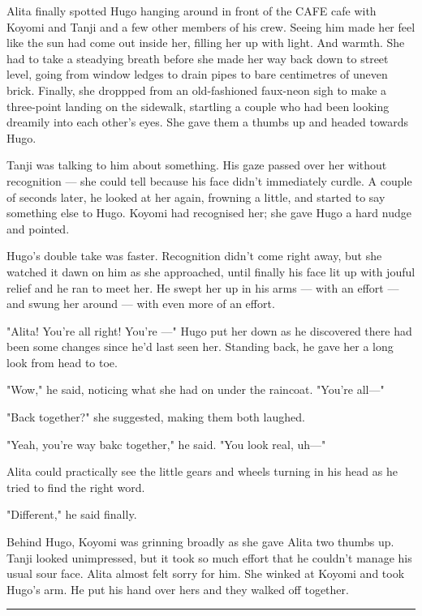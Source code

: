 \documentclass[11pt]{article}
\begin{document}
Alita finally spotted Hugo hanging around in front of the CAFE cafe with Koyomi and Tanji and a few other members of his crew. Seeing him made her feel like the sun had come out inside her, filling her up with light. And warmth. She had to take a steadying breath before she made her way back down to street level, going from window ledges to drain pipes to bare centimetres of uneven brick. Finally, she droppped from an old-fashioned faux-neon sigh to make a three-point landing on the sidewalk, startling a couple who had been looking dreamily into each other's eyes. She gave them a thumbs up and headed towards Hugo.

Tanji was talking to him about something. His gaze passed over her without recognition --- she could tell because his face didn't immediately curdle. A couple of seconds later, he looked at her again, frowning a little, and started to say something else to Hugo. Koyomi had recognised her; she gave Hugo a hard nudge and pointed.

Hugo's double take was faster. Recognition didn't come right away, but she watched it dawn on him as she approached, until finally his face lit up with jouful relief and he ran to meet her. He swept her up in his arms --- with an effort --- and swung her around --- with even more of an effort.

"Alita! You're all right! You're ---" Hugo put her down as he discovered there had been some changes since he'd last seen her. Standing back, he gave her a long look from head to toe.

"Wow," he said, noticing what she had on under the raincoat. "You're all---"

"Back together?" she suggested, making them both laughed.

"Yeah, you're way bakc together," he said. "You look real, uh---"

Alita could practically see the little gears and wheels turning in his head as he tried to find the right word.

"Different," he said finally.

Behind Hugo, Koyomi was grinning broadly as she gave Alita two thumbs up. Tanji looked unimpressed, but it took so much effort that he couldn't manage his usual sour face. Alita almost felt sorry for him. She winked at Koyomi and took Hugo's arm. He put his hand over hers and they walked off together.




\rule{\linewidth}{0.5pt}
\end{document}
